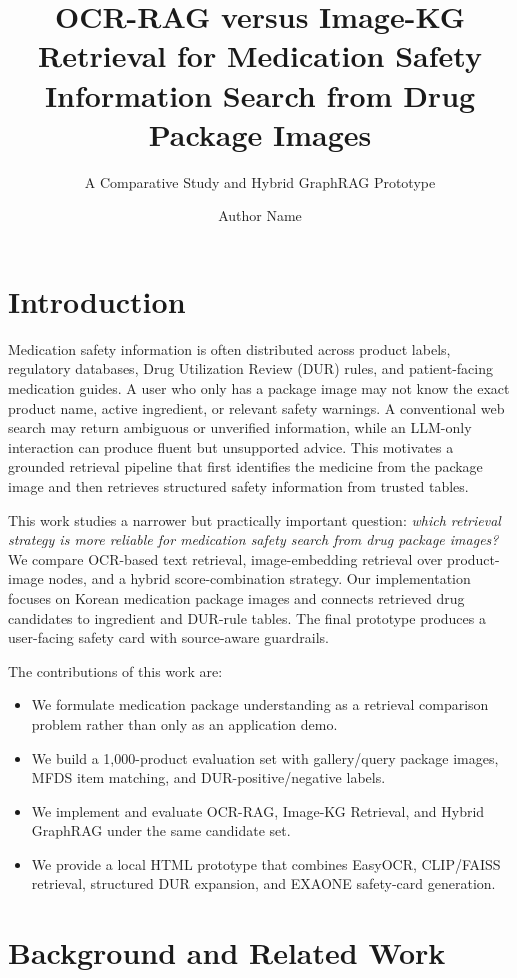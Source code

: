 \documentclass[sigconf,screen,nonacm]{acmart}
\title{OCR-RAG versus Image-KG Retrieval for Medication Safety Information Search from Drug Package Images}
\subtitle{A Comparative Study and Hybrid GraphRAG Prototype}
\author{Author Name}
\affiliation{%
  \institution{Institution Name}
  \city{City}
  \country{Republic of Korea}}
\begin{document}
\maketitle

\section{Introduction}
Medication safety information is often distributed across product labels, regulatory databases, Drug Utilization Review (DUR) rules, and patient-facing medication guides. A user who only has a package image may not know the exact product name, active ingredient, or relevant safety warnings. A conventional web search may return ambiguous or unverified information, while an LLM-only interaction can produce fluent but unsupported advice. This motivates a grounded retrieval pipeline that first identifies the medicine from the package image and then retrieves structured safety information from trusted tables.

This work studies a narrower but practically important question: \emph{which retrieval strategy is more reliable for medication safety search from drug package images?} We compare OCR-based text retrieval, image-embedding retrieval over product-image nodes, and a hybrid score-combination strategy. Our implementation focuses on Korean medication package images and connects retrieved drug candidates to ingredient and DUR-rule tables. The final prototype produces a user-facing safety card with source-aware guardrails.

The contributions of this work are:
\begin{itemize}[leftmargin=*]
    \item We formulate medication package understanding as a retrieval comparison problem rather than only as an application demo.
    \item We build a 1,000-product evaluation set with gallery/query package images, MFDS item matching, and DUR-positive/negative labels.
    \item We implement and evaluate OCR-RAG, Image-KG Retrieval, and Hybrid GraphRAG under the same candidate set.
    \item We provide a local HTML prototype that combines EasyOCR, CLIP/FAISS retrieval, structured DUR expansion, and EXAONE safety-card generation.
\end{itemize}

\section{Background and Related Work}
\end{document}
